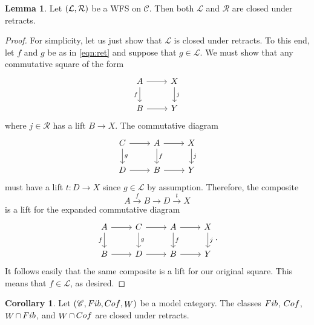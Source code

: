 \documentclass[10pt,letterpaper,cm]{nupset}
\theoremstyle{definition}
\theoremstyle{theorem}
\newtheorem{lemma}[definition]{Lemma}
\newtheorem{corollary}[definition]{Corollary}
\theoremstyle{remark}
\renewcommand{\L}{\mathcal L}
\newcommand{\RI}{\mathcal R}
\newcommand{\0}{\mathbf{0}}
\newcommand{\1}{\mathbf{1}}
\newcommand{\2}{\mathbf{2}}
\renewcommand{\c}{\mathscr{C}}
\DeclareMathOperator{\fib}{\mathnormal{Fib}}
\DeclareMathOperator{\cof}{\mathnormal{Cof}}
\DeclareMathOperator{\we}{\mathnormal{W}}
\begin{document}
\begin{lemma}\label{cloret}
Let $\mleft(\L, \RI\mright)$ be a WFS on $\c$. Then both $\L$ and $\RI$ are closed under retracts. 
\end{lemma}
\begin{proof}
For simplicity, let us just show that $\L$ is closed under retracts. To this end, let $f$ and $g$ be as in \eqref{eqn:ret} and suppose that $g\in \L$.  We must show that any commutative square of the form
\[
\begin{tikzcd}
A \arrow[d, "f"'] \arrow[r] & X \arrow[d, "j"] \\
B \arrow[r]                 & Y               
\end{tikzcd}
\] where $j\in \RI$ has a lift $B \to X$. The commutative diagram 
\[
\begin{tikzcd}
C \arrow[d, "g"] \arrow[r] & A \arrow[d, "f"] \arrow[r] & X \arrow[d, "j"] \\
D \arrow[r]                & B \arrow[r]                & Y               
\end{tikzcd}
\] must have a lift $t: D\to X$ since $g\in \L$ by assumption. Therefore, the composite $$A \overset{f}{\longrightarrow} B \longrightarrow D \overset{t}{\longrightarrow} X$$ is a lift for the expanded commutative diagram
\[
\begin{tikzcd}
A \arrow[d, "f"'] \arrow[r] & C \arrow[d, "g"] \arrow[r] & A \arrow[d, "f"] \arrow[r] & X \arrow[d, "j"] \\
B \arrow[r]                 & D \arrow[r]                & B \arrow[r]                & Y               
\end{tikzcd}.
\] It follows easily that the same composite is a lift for our original square. This means that $f\in \L$, as desired.
\end{proof}

\begin{corollary}\label{CR}
Let  $\mleft(\c, \fib, \cof, \we\mright)$ be a model category. The classes $\fib$, $\cof$, $\we \cap \fib$, and $\we \cap \cof$  are closed under retracts.
\end{corollary}
\end{document}
